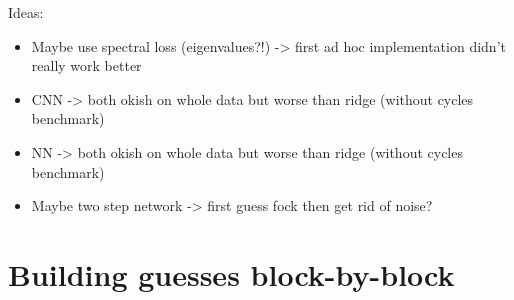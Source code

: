 Ideas: 
\begin{itemize}
    \item Maybe use spectral loss (eigenvalues?!) -> first ad hoc implementation didn't really work better
    \item CNN -> both okish on whole data but worse than ridge (without cycles benchmark) 
    \item NN  -> both okish on whole data but worse than ridge (without cycles benchmark)
    \item Maybe two step network -> first guess fock then get rid of noise?
\end{itemize}


\section{Building guesses block-by-block}
\label{sec:blockwise_guessing}


